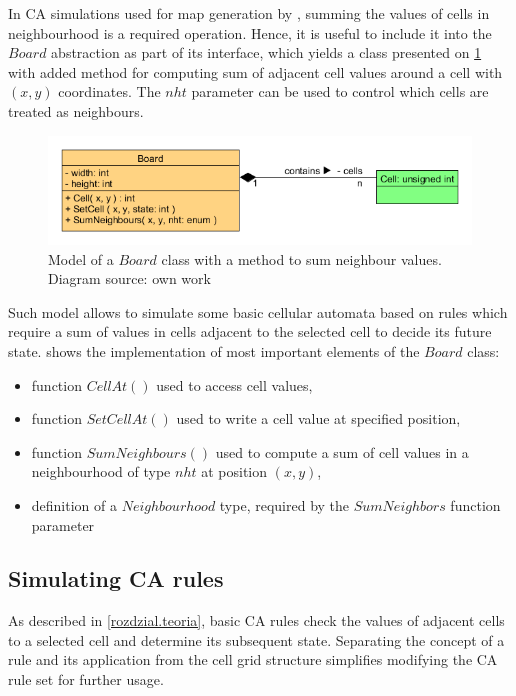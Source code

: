 \documentclass[12pt]{report}
\begin{document}
In CA simulations used for map generation by \autocite{johnson2010cellular}, summing the values of cells in neighbourhood is a required operation. Hence, it is useful to include it into the $Board$ abstraction as part of its interface, which yields a class presented on \cref{fig:boardcell2} with added method for computing sum of adjacent cell values around a cell with $(x,y)$ coordinates. The $nht$ parameter can be used to control which cells are treated as neighbours.

\begin{figure}[h]
	\centering
	\includegraphics[width=0.8\linewidth]{diagrams/boardcell02}
	\caption{Model of a $Board$ class with a method to sum neighbour values. Diagram source: own work} 
	\label{fig:boardcell2}
\end{figure} 
 
Such model allows to simulate some basic cellular automata based on rules which require a sum of values in cells adjacent to the selected cell to decide its future state.  shows the implementation of most important elements of the $Board$ class: 
\begin{itemize}
	\item function $CellAt()$ used to access cell values,
	\item function $SetCellAt()$ used to write a cell value at specified position,
	\item function $SumNeighbours()$ used to compute a sum of cell values in a neighbourhood of type $nht$ at position $(x,y)$, 
	\item definition of a $Neighbourhood$ type, required by the $SumNeighbors$ function parameter
\end{itemize}
 

 
 
\subsection{Simulating CA rules} 

As described in \cref{rozdzial.teoria}, basic CA rules check the values of adjacent cells to a selected cell and determine its subsequent state. Separating the concept of a rule and its application from the cell grid structure simplifies modifying the CA rule set for further usage.
\end{document}
